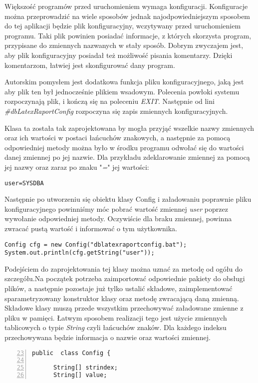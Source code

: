 Większość programów przed uruchomieniem wymaga konfiguracji. Konfiguracje można przeprowadzić na wiele sposobów jednak najodpowiedniejszym sposobem do tej aplikacji będzie plik konfiguracyjny, wczytywany przed uruchomieniem programu. Taki plik powinien posiadać informacje, z których skorzysta program, przypisane do zmiennych nazwanych w stały sposób.  Dobrym zwyczajem jest, aby plik konfiguracyjny posiadał też możliwość pisania komentarzy. Dzięki komentarzom, łatwiej jest skonfigurować dany program.
\par
Autorskim pomysłem jest dodatkowa funkcja pliku konfiguracyjnego, jaką jest aby plik ten był jednocześnie plikiem wsadowym. Polecenia powłoki systemu rozpoczynają plik, i kończą się na poleceniu \emph{EXIT}. Następnie od lini \emph{\#dbLatexRaportConfig} rozpoczyna się zapis zmiennych konfiguracyjnych.
\par
Klasa ta została tak zaprojektowana by mogła przyjąć wszelkie nazwy zmiennych oraz ich wartości w postaci łańcuchów znakowych, a następnie za pomocą odpowiedniej metody można było w środku programu odwołać się do wartości danej zmiennej po jej nazwie. Dla przykładu zdeklarowanie zmiennej za pomocą jej nazwy oraz zaraz po znaku "\emph{=}"  jej wartości:
\begin{lstlisting}
user=SYSDBA
\end{lstlisting}
Następnie po utworzeniu się obiektu klasy Config i załadowaniu poprawnie pliku konfiguracyjnego powinniśmy móc pobrać wartość  zmiennej \emph{user} poprzez wywołanie odpowiedniej metody. Oczywiście dla braku zmiennej, powinna zwracać pustą wartość i informować o tym użytkownika.
\begin{lstlisting}
Config cfg = new Config("dblatexraportconfig.bat");
System.out.println(cfg.getString("user"));
\end{lstlisting}

Podejściem do zaprojektowania tej klasy można uznać za metodę od ogółu do szczegółu.Na początek potrzeba zaimportować odpowiednie pakiety do obsługi plików, a następnie pozostaje już tylko ustalić składowe, zaimplementować sparametryzowany konstruktor klasy oraz metodę zwracającą daną zmienną. Składowe klasy muszą przede wszystkim przechowywać załadowane zmienne z pliku w pamięci. Łatwym sposobem realizacji tego jest użycie zmiennych tablicowych o typie \emph{String} czyli łańcuchów znaków. Dla każdego indeksu przechowywana będzie informacja o nazwie oraz wartości zmiennej. 
\begin{lstlisting}[numbers=left,firstnumber=23]
public  class Config {

      String[] strindex;
      String[] value; 
\end{lstlisting}

